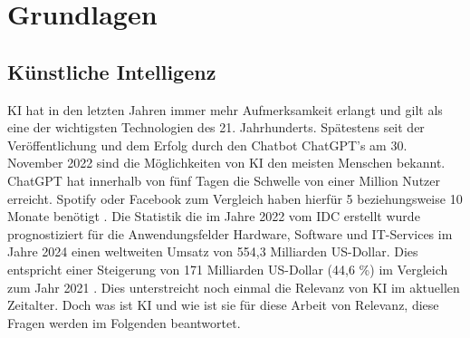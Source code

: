\section{Grundlagen}
\subsection{Künstliche Intelligenz}
\ac{KI} hat in den letzten Jahren immer mehr Aufmerksamkeit erlangt und gilt als eine der wichtigsten Technologien des 21. Jahrhunderts.
Spätestens seit der Veröffentlichung und dem Erfolg durch den Chatbot ChatGPT's am 30. November 2022 sind die Möglichkeiten von \ac{KI} den meisten Menschen bekannt. ChatGPT hat innerhalb von fünf Tagen die Schwelle von einer Million Nutzer erreicht. Spotify oder Facebook zum Vergleich haben hierfür 5 beziehungsweise 10 Monate benötigt \autocite*[vgl. ][]{janson_infografik_2023}.
\newparagraph
Die Statistik die im Jahre 2022 vom IDC erstellt wurde prognostiziert für die Anwendungsfelder Hardware, Software und IT-Services im Jahre 2024 einen weltweiten Umsatz von 554,3 Milliarden US-Dollar.
Dies entspricht einer Steigerung von 171 Milliarden US-Dollar (44,6 \%) im Vergleich zum Jahr 2021 \autocite*[vgl. ][]{idc_kunstliche_2022}.
Dies unterstreicht noch einmal die Relevanz von \ac{KI} im aktuellen Zeitalter.
Doch was ist \ac{KI} und wie ist sie für diese Arbeit von Relevanz, diese Fragen werden im Folgenden beantwortet.